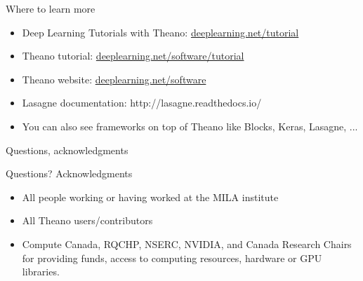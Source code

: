 \documentclass[utf8x,xcolor=pdftex,dvipsnames,table]{beamer}
\begin{document}
\begin{frame}{Where to learn more}
\normalsize
\begin{itemize}
\item Deep Learning Tutorials with Theano: \url{deeplearning.net/tutorial}
\item Theano tutorial: \url{deeplearning.net/software/tutorial}
\item Theano website: \url{deeplearning.net/software}
\item Lasagne documentation: http://lasagne.readthedocs.io/
\item You can also see frameworks on top of Theano like Blocks, Keras, Lasagne, ...
\end{itemize}

\end{frame}

\begin{frame}{Questions, acknowledgments}
\Huge
\begin{center}
Questions?\newline
Acknowledgments
\end{center}
\normalsize
\begin{itemize}
\item All people working or having worked at the MILA institute
\item All Theano users/contributors
\item Compute Canada, RQCHP, NSERC, NVIDIA, and Canada Research Chairs for providing funds, access to computing resources, hardware or GPU libraries.
\end{itemize}

\end{frame}
\end{document}
